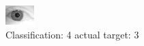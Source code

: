 \begin{figure}[h!]
\begin{center}
\includegraphics[width=0.60\columnwidth]{figures/ID2082_class_4_target_3.png}
\end{center}
\caption{ Classification: 4 actual target: 3}
\label{fig:ID2082_class_4_target_3}
\end{figure}
